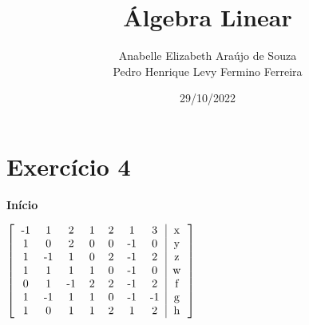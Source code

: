 \documentclass{article}
\title{Álgebra Linear}
\date{29/10/2022}
\author{Anabelle Elizabeth Araújo de Souza\\Pedro Henrique Levy Fermino Ferreira\\}
\begin{document}
\maketitle

\section{Exercício 4}\label{ex4}

\textbf{Início}
\begin{hbox}{

$\left[
\begin{tabular}{ccccccc|c}
-1 & 1 & 2 & 1 & 2 & 1 & 3 & x\\
1 & 0 & 2 & 0 & 0 & -1 & 0 & y\\
1 & -1 & 1 & 0 & 2 & -1 & 2 & z\\
1 & 1 & 1 & 1 & 0 & -1 & 0 & w\\
0 & 1 & -1 & 2 & 2 & -1 & 2 & f\\
1 & -1 & 1 & 1 & 0 & -1 & -1 & g\\
1 & 0 & 1 & 1 & 2 & 1 & 2 & h\\
\end{tabular}
\right]
$}
\end{hbox}
\\\\\\\\\\
\end{document}
